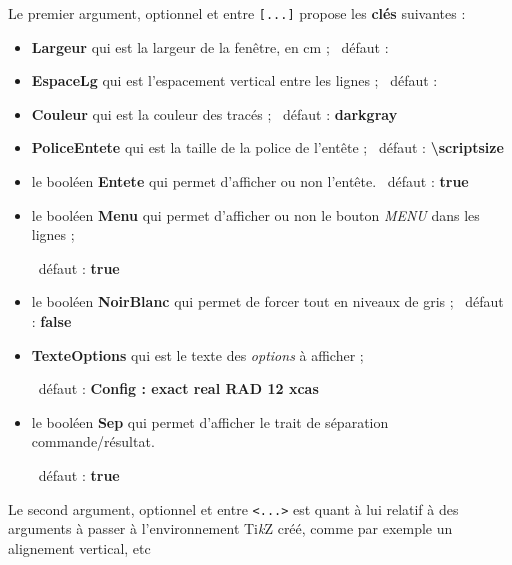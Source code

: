\documentclass[french,a4paper,11pt]{article}
\providecommand\tikzlogo{Ti\textit{k}Z}
\let\TikZ\tikzlogo
\newcommand\Cle[1]{{\bfseries\sffamily\textlangle #1\textrangle}}
\begin{document}
\begin{tipblock}
Le premier argument, optionnel et entre \texttt{[...]} propose les \Cle{clés} suivantes :

\begin{itemize}
	\item \Cle{Largeur} qui est la largeur de la fenêtre, en cm ; \hfill~défaut : \Cle{10}
	\item \Cle{EspaceLg} qui est l'espacement vertical entre les lignes ; \hfill~défaut : \Cle{2pt}
	\item \Cle{Couleur} qui est la couleur des tracés ; \hfill~défaut : \Cle{darkgray}
	\item \Cle{PoliceEntete} qui est la taille de la police de l'entête ; \hfill~défaut : \Cle{\textbackslash scriptsize}
	\item le booléen \Cle{Entete} qui permet d'afficher ou non l'entête. \hfill~défaut : \Cle{true}
	\item le booléen \Cle{Menu} qui permet d'afficher ou non le bouton \textit{MENU} dans les lignes ;
	
	\hfill~défaut : \Cle{true}
	\item le booléen \Cle{NoirBlanc} qui permet de forcer tout en niveaux de gris ; \hfill~défaut : \Cle{false}
	\item \Cle{TexteOptions} qui est le texte des \textit{options} à afficher ;
	
	\hfill~défaut : \Cle{Config : exact real RAD 12 xcas}
	\item le booléen \Cle{Sep} qui permet d'afficher le trait de séparation commande/résultat.
	
	\hfill~défaut : \Cle{true}
\end{itemize}
\vspace*{-\baselineskip}\leavevmode
\end{tipblock}

\begin{tipblock}
Le second argument, optionnel et entre \texttt{<...>} est quant à lui relatif à des arguments à passer à l'environnement \TikZ{} créé, comme par exemple un alignement vertical, etc
\end{tipblock}

\begin{PresentationCode}{}
\begin{CalculFormelXcas}[PoliceEntete=\large,Largeur=13,NoirBlanc]
\end{CalculFormelXcas}
\end{PresentationCode}
\end{document}
